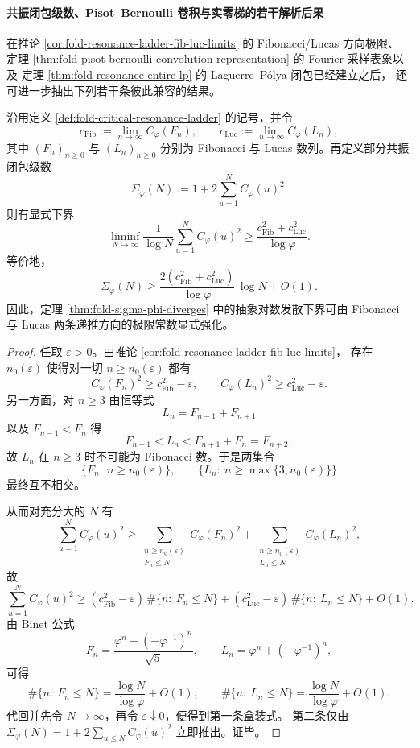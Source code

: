 \paragraph{共振闭包级数、Pisot--Bernoulli 卷积与实零梯的若干解析后果}
在推论 \ref{cor:fold-resonance-ladder-fib-luc-limits} 的 Fibonacci/Lucas 方向极限、
定理 \ref{thm:fold-pisot-bernoulli-convolution-representation} 的 Fourier 采样表象以及
定理 \ref{thm:fold-resonance-entire-lp} 的 Laguerre--P\'olya 闭包已经建立之后，
还可进一步抽出下列若干条彼此兼容的结果。

\begin{theorem}\label{thm:xi-resonance-closure-log-lower-bound-fib-luc}
沿用定义 \ref{def:fold-critical-resonance-ladder} 的记号，并令
\[
c_{\mathrm{Fib}}:=\lim_{n\to\infty}C_\varphi(F_n),
\qquad
c_{\mathrm{Luc}}:=\lim_{n\to\infty}C_\varphi(L_n),
\]
其中 \((F_n)_{n\ge 0}\) 与 \((L_n)_{n\ge 0}\) 分别为 Fibonacci 与 Lucas 数列。再定义部分共振闭包级数
\[
\Sigma_\varphi(N):=1+2\sum_{u=1}^{N}C_\varphi(u)^2.
\]
则有显式下界
\[
\boxed{\;
\liminf_{N\to\infty}
\frac{1}{\log N}\sum_{u=1}^{N}C_\varphi(u)^2
\ge
\frac{c_{\mathrm{Fib}}^2+c_{\mathrm{Luc}}^2}{\log\varphi}.\;}
\]
等价地，
\[
\boxed{\;
\Sigma_\varphi(N)\ge
\frac{2(c_{\mathrm{Fib}}^2+c_{\mathrm{Luc}}^2)}{\log\varphi}\,\log N+O(1).\;}
\]
因此，定理 \ref{thm:fold-sigma-phi-diverges} 中的抽象对数发散下界可由
Fibonacci 与 Lucas 两条递推方向的极限常数显式强化。
\end{theorem}




\begin{proof}
任取 \(\varepsilon>0\)。由推论 \ref{cor:fold-resonance-ladder-fib-luc-limits}，
存在 \(n_0(\varepsilon)\) 使得对一切 \(n\ge n_0(\varepsilon)\) 都有
\[
C_\varphi(F_n)^2\ge c_{\mathrm{Fib}}^2-\varepsilon,
\qquad
C_\varphi(L_n)^2\ge c_{\mathrm{Luc}}^2-\varepsilon.
\]
另一方面，对 \(n\ge 3\) 由恒等式
\[
L_n=F_{n-1}+F_{n+1}
\]
以及 \(F_{n-1}<F_n\) 得
\[
F_{n+1}<L_n<F_{n+1}+F_n=F_{n+2},
\]
故 \(L_n\) 在 \(n\ge 3\) 时不可能为 Fibonacci 数。于是两集合
\[
\{F_n:\ n\ge n_0(\varepsilon)\},
\qquad
\{L_n:\ n\ge \max\{3,n_0(\varepsilon)\}\}
\]
最终互不相交。

从而对充分大的 \(N\) 有
\[
\sum_{u=1}^{N}C_\varphi(u)^2
\ge
\sum_{\substack{n\ge n_0(\varepsilon)\\ F_n\le N}}C_\varphi(F_n)^2
+
\sum_{\substack{n\ge n_0(\varepsilon)\\ L_n\le N}}C_\varphi(L_n)^2,
\]
故
\[
\sum_{u=1}^{N}C_\varphi(u)^2
\ge
(c_{\mathrm{Fib}}^2-\varepsilon)\,\#\{n:\ F_n\le N\}
+
(c_{\mathrm{Luc}}^2-\varepsilon)\,\#\{n:\ L_n\le N\}
+O(1).
\]
由 Binet 公式
\[
F_n=\frac{\varphi^n-(-\varphi^{-1})^n}{\sqrt5},
\qquad
L_n=\varphi^n+(-\varphi^{-1})^n,
\]
可得
\[
\#\{n:\ F_n\le N\}=\frac{\log N}{\log\varphi}+O(1),
\qquad
\#\{n:\ L_n\le N\}=\frac{\log N}{\log\varphi}+O(1).
\]
代回并先令 \(N\to\infty\)，再令 \(\varepsilon\downarrow 0\)，便得到第一条盒装式。
第二条仅由 \(\Sigma_\varphi(N)=1+2\sum_{u\le N}C_\varphi(u)^2\) 立即推出。证毕。
\end{proof}

